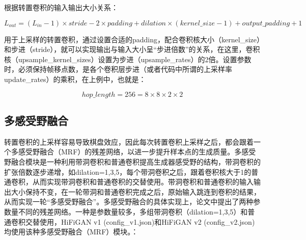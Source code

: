 \documentclass[cn,10pt,math=newtx,citestyle=gb7714-2015,bibstyle=gb7714-2015]{elegantbook}
\begin{document}
根据转置卷积的输入输出大小关系：

\begin{equation}
  L_{out}=(L_{in}-1)\times stride-2\times padding+dilation\times (kernel\_size-1)+output\_padding+1
\end{equation}

用于上采样的转置卷积，通过设置合适的padding，配合卷积核大小（kernel\_size）和步进（stride），就可以实现输出与输入大小呈“步进倍数”的关系，在这里，卷积核（upsample\_kernel\_sizes）设置为步进（upsample\_rates）的2倍。设置参数时，必须保持帧移点数，是各个卷积层步进（或者代码中所谓的上采样率update\_rates）的乘积，在上例中，也就是：

\begin{equation}
  hop\_length=256=8\times 8\times 2\times 2
\end{equation}

\subsection{多感受野融合}

转置卷积的上采样容易导致棋盘效应，因此每次转置卷积上采样之后，都会跟着一个多感受野融合（MRF）的残差网络，以进一步提升样本点的生成质量。多感受野融合模块是一种利用带洞卷积和普通卷积提高生成器感受野的结构，带洞卷积的扩张倍数逐步递增，如dilation=1,3,5，每个带洞卷积之后，跟着卷积核大于1的普通卷积，从而实现带洞卷积和普通卷积的交替使用。带洞卷积和普通卷积的输入输出大小保持不变，在一轮带洞和普通卷积完成之后，原始输入跳连到卷积的结果，从而实现一轮“多感受野融合”。多感受野融合的具体实现上，论文中提出了两种参数量不同的残差网络。一种是参数量较多，多组带洞卷积（dilation=1,3,5）和普通卷积交替使用，HiFiGAN v1 (config\_v1.json)和HiFiGAN v2 (config\_v2.json)均使用该种多感受野融合（MRF）模块。：
\end{document}
